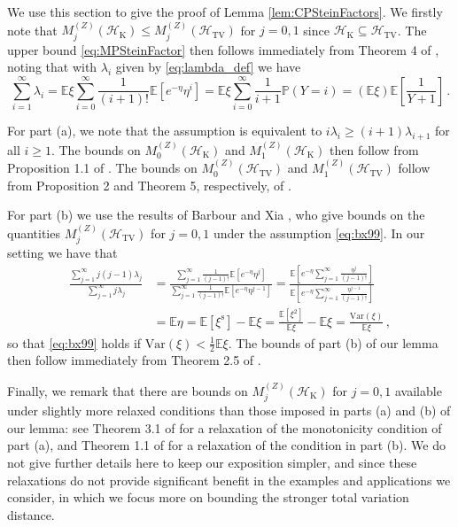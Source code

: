\documentclass[12pt]{article}
\begin{document}
We use this section to give the proof of Lemma \ref{lem:CPSteinFactors}. We firstly note that $M_j^{(Z)}(\mathcal{H}_\text{K})\leq M_j^{(Z)}(\mathcal{H}_\text{TV})$ for $j=0,1$ since $\mathcal{H}_\text{K}\subseteq\mathcal{H}_\text{TV}$. The upper bound \eqref{eq:MPSteinFactor} then follows immediately from Theorem 4 of \cite{barbour92_paper}, noting that with $\lambda_i$ given by \eqref{eq:lambda_def} we have
\[
\sum_{i=1}^\infty\lambda_i=\mathbb{E}\xi\sum_{i=0}^\infty\frac{1}{(i+1)!}\mathbb{E}[e^{-\eta}\eta^{i}]=\mathbb{E}\xi\sum_{i=0}^\infty\frac{1}{i+1}\mathbb{P}(Y=i)=(\mathbb{E}\xi)\mathbb{E}\left[\frac{1}{Y+1}\right]\,.
\]

For part (a), we note that the assumption is equivalent to $i\lambda_i\geq(i+1)\lambda_{i+1}$ for all $i\geq1$. The bounds on $M_0^{(Z)}(\mathcal{H}_\text{K})$ and $M_1^{(Z)}(\mathcal{H}_\text{K})$ then follow from Proposition 1.1 of \cite{barbour00}. The bounds on $M_0^{(Z)}(\mathcal{H}_\text{TV})$ and $M_1^{(Z)}(\mathcal{H}_\text{TV})$ follow from Proposition 2 and Theorem 5, respectively, of \cite{barbour92_paper}.

For part (b) we use the results of Barbour and Xia \cite{barbour99}, who give bounds on the quantities $M_j^{(Z)}(\mathcal{H}_\text{TV})$ for $j=0,1$ under the assumption \eqref{eq:bx99}. In our setting we have that 
\begin{align*}
\frac{\sum_{j=1}^\infty j(j-1)\lambda_j}{\sum_{j=1}^\infty j\lambda_j}&=\frac{\sum_{j=1}^\infty\frac{1}{(j-1)!}\mathbb{E}[e^{-\eta}\eta^j]}{\sum_{j=1}^\infty\frac{1}{(j-1)!}\mathbb{E}[e^{-\eta}\eta^{j-1}]}=\frac{\mathbb{E}[e^{-\eta}\sum_{j=1}^\infty\frac{\eta^j}{(j-1)!}]}{\mathbb{E}[e^{-\eta}\sum_{j=1}^\infty\frac{\eta^{j-1}}{(j-1)!}]}\\
&=\mathbb{E}\eta=\mathbb{E}[\xi^\text{s}]-\mathbb{E}\xi=\frac{\mathbb{E}[\xi^2]}{\mathbb{E}\xi}-\mathbb{E}\xi=\frac{\text{Var}(\xi)}{\mathbb{E}\xi}\,,
\end{align*}
so that \eqref{eq:bx99} holds if $\text{Var}(\xi)<\frac{1}{2}\mathbb{E}\xi$. The bounds of part (b) of our lemma then follow immediately from Theorem 2.5 of \cite{barbour99}.  

Finally, we remark that there are bounds on $M_j^{(Z)}(\mathcal{H}_\text{K})$ for $j=0,1$ available under slightly more relaxed conditions than those imposed in parts (a) and (b) of our lemma: see Theorem 3.1 of \cite{barbour98} for a relaxation of the monotonicity condition of part (a), and Theorem 1.1 of \cite{daly17} for a relaxation of the condition in part (b). We do not give further details here to keep our exposition simpler, and since these relaxations do not provide significant benefit in the examples and applications we consider, in which we focus more on bounding the stronger total variation distance. 
\end{document}
